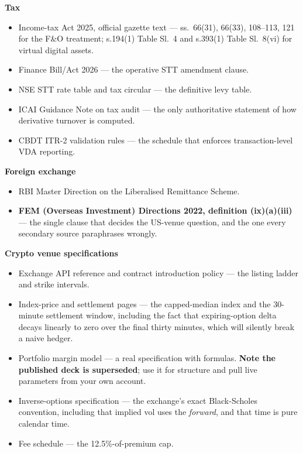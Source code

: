 \documentclass[11pt,a4paper]{article}
\begin{document}
\textbf{Tax}
\begin{itemize}\footnotesize
\item Income-tax Act 2025, official gazette text --- ss.\ 66(31), 66(33), 108--113, 121 for the F\&O treatment; s.194(1) Table Sl.\ 4 and s.393(1) Table Sl.\ 8(vi) for virtual digital assets.
\item Finance Bill/Act 2026 --- the operative STT amendment clause.
\item NSE STT rate table and tax circular --- the definitive levy table.
\item ICAI Guidance Note on tax audit --- the only authoritative statement of how derivative turnover is computed.
\item CBDT ITR-2 validation rules --- the schedule that enforces transaction-level VDA reporting.
\end{itemize}

\textbf{Foreign exchange}
\begin{itemize}\footnotesize
\item RBI Master Direction on the Liberalised Remittance Scheme.
\item \textbf{FEM (Overseas Investment) Directions 2022, definition (ix)(a)(iii)} --- the single clause that decides the US-venue question, and the one every secondary source paraphrases wrongly.
\end{itemize}

\textbf{Crypto venue specifications}
\begin{itemize}\footnotesize
\item Exchange API reference and contract introduction policy --- the listing ladder and strike intervals.
\item Index-price and settlement pages --- the capped-median index and the 30-minute settlement window, including the fact that expiring-option delta decays linearly to zero over the final thirty minutes, which will silently break a naive hedger.
\item Portfolio margin model --- a real specification with formulas. \textbf{Note the published deck is superseded}; use it for structure and pull live parameters from your own account.
\item Inverse-options specification --- the exchange's exact Black-Scholes convention, including that implied vol uses the \emph{forward}, and that time is pure calendar time.
\item Fee schedule --- the 12.5\%-of-premium cap.
\end{itemize}
\end{document}

